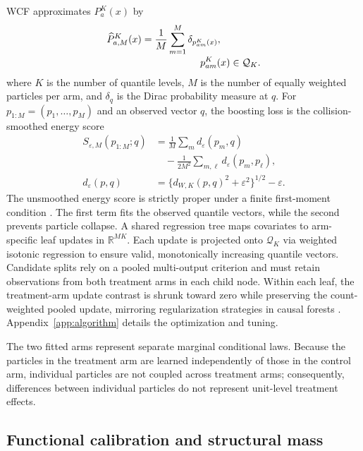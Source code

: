 \documentclass[twoside]{article}
\newcommand{\QK}{\mathcal{Q}_K}
\begin{document}
WCF approximates $P_a^K(x)$ by
\begin{align}
 \widehat P_{a,M}^K(x)&=\frac{1}{M}\sum_{m=1}^M
 \delta_{p_{am}^K(x)},\label{eq:particle-law}\\[-2pt]
 &\hspace{2.1cm}p_{am}^K(x)\in\QK.\nonumber
\end{align}
where $K$ is the number of quantile levels, $M$ is the number of equally weighted particles per arm, and $\delta_q$ is the Dirac probability measure at $q$. For $p_{1:M}=(p_1,\ldots,p_M)$ and an observed vector $q$, the boosting loss is the collision-smoothed energy score
\begin{align}
 S_{\varepsilon,M}(p_{1:M};q)
 &=\frac1M\sum_m d_\varepsilon(p_m,q)\nonumber\\
 &\quad-\frac{1}{2M^2}\sum_{m,\ell}d_\varepsilon(p_m,p_\ell),\label{eq:energy}\\
 d_\varepsilon(p,q)&=
 \{d_{W,K}(p,q)^2+\varepsilon^2\}^{1/2}-\varepsilon.
\end{align}
The unsmoothed energy score is strictly proper under a finite first-moment condition \citep{gneiting2007proper}. The first term fits the observed quantile vectors, while the second prevents particle collapse. A shared regression tree maps covariates to arm-specific leaf updates in $\mathbb R^{MK}$. Each update is projected onto $\QK$ via weighted isotonic regression to ensure valid, monotonically increasing quantile vectors. Candidate splits rely on a pooled multi-output criterion and must retain observations from both treatment arms in each child node. Within each leaf, the treatment-arm update contrast is shrunk toward zero while preserving the count-weighted pooled update, mirroring regularization strategies in causal forests \citep{wager2018estimation}. Appendix~\ref{app:algorithm} details the optimization and tuning.

The two fitted arms represent separate marginal conditional laws. Because the particles in the treatment arm are learned independently of those in the control arm, individual particles are not coupled across treatment arms; consequently, differences between individual particles do not represent unit-level treatment effects.

\subsection{Functional calibration and structural mass}\label{sec:calibration}
\end{document}
